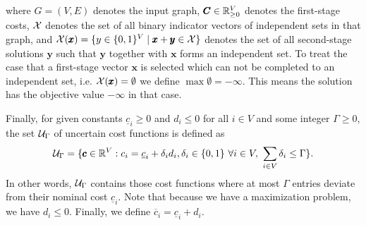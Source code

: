 where $G = (V,E)$ denotes the input graph, $\pmb C \in \mathbb{R}_{\geq 0}^V$ denotes the first-stage costs, $\mathcal{X}$ denotes the set of all binary indicator vectors of independent sets in that graph, and $\mathcal{X}(\pmb x) = \{ y \in \{ 0,1 \}^V \mid \pmb x + \pmb y \in \mathcal{X} \}$ denotes the set of all second-stage solutions $\pmb y$ such that $\pmb y$ together with $\pmb x$ forms an independent set. To treat the case that a first-stage vector $\pmb x$ is selected which can not be completed to an independent set, i.e. $\mathcal{X}(\pmb x) = \emptyset$ we define $\max \emptyset = -\infty$. This means the solution has the objective value $-\infty$ in that case.

Finally, for given constants $\underline{c}_i \geq 0$ and $d_i \leq 0$ for all $i \in V$ and some integer $\Gamma \geq 0$, the set $\mathcal{U}_\Gamma$ of uncertain cost functions is defined as
\[
\mathcal{U}_\Gamma = \{  \pmb c \in \mathbb{R}^V : c_i = \underline{c}_i + \delta_id_i, \delta_i \in \{ 0,1 \}\ \forall i \in V,\ \sum_{i \in V}\delta_i \leq \Gamma  \}.
\]
In other words, $\mathcal{U}_\Gamma$ contains those cost functions where at most $\Gamma$ entries deviate from their nominal cost $\underline{c}_i$. Note that because we have a maximization problem, we have $d_i \leq 0$. Finally, we define $\overline{c}_i = \underline{c}_i + d_i$.

